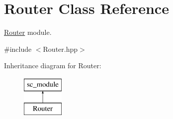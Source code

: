 \hypertarget{classRouter}{\section{Router Class Reference}
\label{classRouter}
}


\hyperlink{classRouter}{Router} module.  




{\ttfamily \#include $<$Router.\-hpp$>$}

Inheritance diagram for Router\-:\begin{figure}[H]
\begin{center}
\leavevmode
\includegraphics[height=2.000000cm]{classRouter}
\end{center}
\end{figure}
